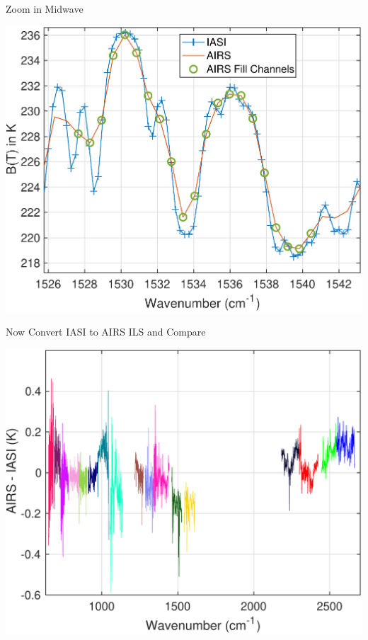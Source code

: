 \documentclass[10pt,t]{beamer}
\begin{document}
\begin{frame}[label={sec:orge73e5cb}]{Zoom in Midwave}
\begin{center}
\includegraphics[width=0.8\linewidth]{./Figs/Pdf/airs_iasi_sno_native_with_fill_marked_mwzoom5.pdf}
\end{center}
\end{frame}
\begin{frame}[label={sec:orgd2f9278}]{Now Convert IASI to AIRS ILS and Compare}
\begin{center}
\includegraphics[width=0.8\linewidth]{./Figs/Pdf/sno_airs_m_iasi_no_fill.pdf}
\end{center}
\end{frame}
\end{document}
